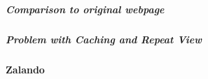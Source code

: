 








\subparagraph{Comparison to original webpage}






\subparagraph{Problem with Caching and Repeat View}






\paragraph{Zalando}



